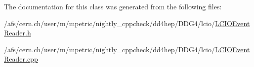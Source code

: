 The documentation for this class was generated from the following files\+:\begin{DoxyCompactItemize}
\item 
/afs/cern.\+ch/user/m/mpetric/nightly\+\_\+cppcheck/dd4hep/\+D\+D\+G4/lcio/\hyperlink{_l_c_i_o_event_reader_8h}{L\+C\+I\+O\+Event\+Reader.\+h}\item 
/afs/cern.\+ch/user/m/mpetric/nightly\+\_\+cppcheck/dd4hep/\+D\+D\+G4/lcio/\hyperlink{_l_c_i_o_event_reader_8cpp}{L\+C\+I\+O\+Event\+Reader.\+cpp}\end{DoxyCompactItemize}
